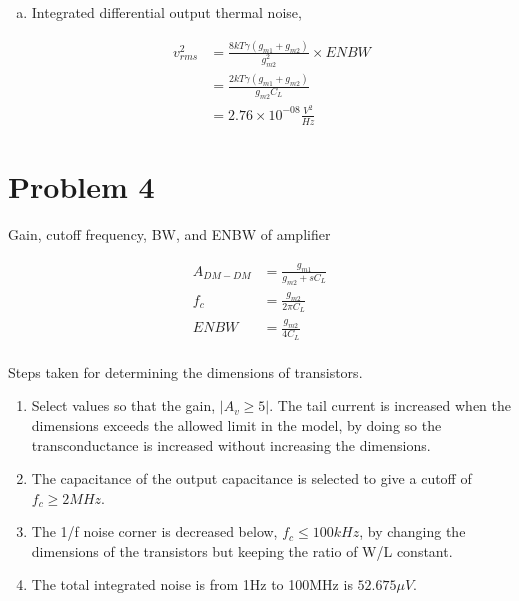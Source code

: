\documentclass{article}
\begin{document}
\begin{enumerate}[(a)]
\item Integrated differential output thermal noise,

\begin{equation*}
\begin{aligned}
v_{rms}^2 &= \frac{8kT\gamma{}(g_{m1} + g_{m2})}{g_{m2}^{2}} \times ENBW \\
&= \frac{2kT\gamma{}(g_{m1} + g_{m2})}{g_{m2}C_{L}} \\
&= 2.76 \times 10^{-08} \frac{V^{2}}{Hz}
\end{aligned}
\end{equation*}
\end{enumerate}


\section{Problem 4}
\label{sec:org294a3a5}
Gain, cutoff frequency, BW, and ENBW of amplifier

\begin{equation*}
\begin{aligned}
A_{DM-DM} &= \frac{g_{m1}}{g_{m2} + sC_{L}} \\
f_{c} &= \frac{g_{m2}}{2\pi{}C_{L}} \\
ENBW &= \frac{g_{m2}}{4C_{L}} \\
\end{aligned}
\end{equation*}


Steps taken for determining the dimensions of transistors.
\begin{enumerate}
\item Select values so that the gain, \(|A_{v} \geq 5|\). The tail current is increased when the dimensions exceeds
the allowed limit in the model, by doing so the transconductance is increased without increasing the dimensions.
\item The capacitance of the output capacitance is selected to give a cutoff of \(f_{c} \geq 2MHz\).
\item The 1/f noise corner is decreased below, \(f_{c} \leq 100kHz\), by changing the
dimensions of the transistors but keeping the ratio of W/L constant.
\item The total integrated noise is from 1Hz to 100MHz is \(52.675 \mu{}V\).
\end{enumerate}
\end{document}

